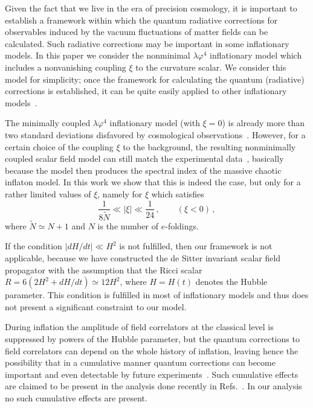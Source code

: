 \documentclass[aps,12pt,superscriptaddress,preprintnumbers,
                secnumarabic,nofootinbib,showpacs]{revtex4}
\begin{document}
Given the fact that we live in the era of precision cosmology, it
is important to establish a framework within which the quantum
radiative corrections for observables
 induced by the vacuum fluctuations of matter fields can be calculated.
Such radiative corrections may be important in some inflationary models.
In this paper we consider the nonminimal
${\lambda\varphi^4}$ inflationary model which includes a nonvanishing
coupling $\xi$ to the curvature scalar.
 We consider this model for simplicity; once the framework for
calculating the quantum (radiative) corrections is established, it
can be quite easily applied to other inflationary
models~\cite{ProkopecBilandzic}.

The minimally coupled ${\lambda\varphi^4}$ inflationary model
(with $\xi=0$) is already more than two standard deviations
disfavored by cosmological observations~\cite{Spergel:2006}.
However, for a certain choice of the coupling $\xi$ to the
background, the resulting nonminimally coupled scalar field model
can still match the experimental data~\cite{HwangNoh:1998,
KomatsuFutamase:1999, FakirUnruh:1990,Tsujikawa:2004my}, 
basically because
the model then produces the spectral index of
the massive chaotic inflaton model.
In this work we show that this is indeed the case,
but only for a rather limited values of $\xi$, namely for $\xi$ which satisfies
\begin{equation}
\frac{1}{8\tilde{N}}\ll |\xi | \ll\frac{1}{24}\,,\qquad (\xi<0) \,,
\label{condition on neg xi}
\end{equation}
where $\tilde{N}\simeq N+1$ and $N$ is the number of $e$-foldings.

If the condition $|dH/dt| \ll H^2$ is not
fulfilled, then our framework is not applicable, because we have
constructed the de Sitter invariant scalar field propagator with the
assumption that the Ricci scalar 
$R = 6(2H^2+d{H}/dt) \simeq 12H^2$, where $H=H(t)$ denotes the 
Hubble parameter. This condition is
fulfilled in most of inflationary models and thus does not present
a significant constraint to our model.

During inflation the amplitude of field correlators at the classical
level is suppressed by powers of the Hubble parameter, but the quantum
corrections to field correlators can depend on the whole history
of inflation, leaving hence the possibility that in a cumulative
manner quantum corrections can become important and even
detectable by future
experiments~\cite{BoyanovskydeVegaSanchez:2006,BoyanovskydeVegaSanchez:2005,Boyanovsky:2004ph,Weinberg:2005,Weinberg:2006}.
Such cumulative effects are claimed to be present in the analysis done
recently in Refs.~\cite{Sloth:2006az,Sloth:2006nu}. In our
analysis no such cumulative effects are present.
\end{document}
